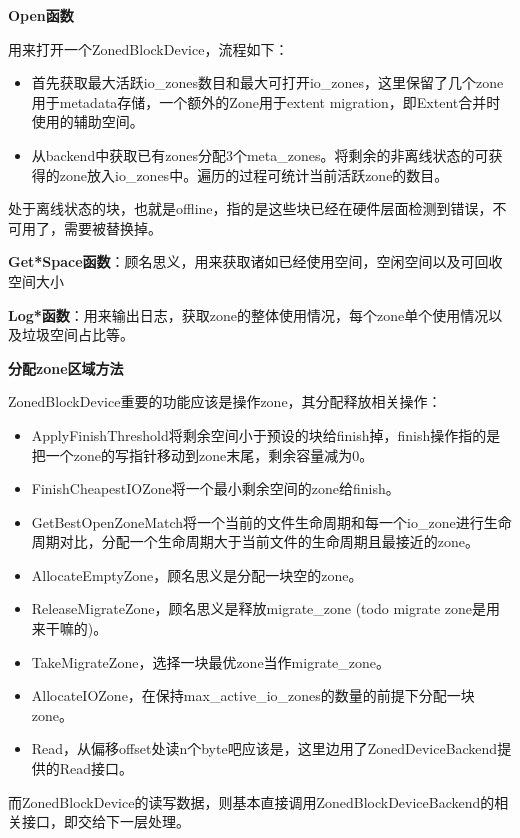 \textbf {Open函数}

用来打开一个ZonedBlockDevice，流程如下：

\begin{itemize}
  \item 首先获取最大活跃io\_zones数目和最大可打开io\_zones，这里保留了几个zone用于metadata存储，一个额外的Zone用于extent migration，即Extent合并时使用的辅助空间。
  \item 从backend中获取已有zones分配3个meta\_zones。将剩余的非离线状态的可获得的zone放入io\_zones中。遍历的过程可统计当前活跃zone的数目。
\end{itemize}

处于离线状态的块，也就是offline，指的是这些块已经在硬件层面检测到错误，不可用了，需要被替换掉。

\textbf {Get*Space函数}：顾名思义，用来获取诸如已经使用空间，空闲空间以及可回收空间大小

\textbf {Log*函数}：用来输出日志，获取zone的整体使用情况，每个zone单个使用情况以及垃圾空间占比等。

\textbf {分配zone区域方法}

ZonedBlockDevice重要的功能应该是操作zone，其分配释放相关操作：

\begin{itemize}
\item ApplyFinishThreshold将剩余空间小于预设的块给finish掉，finish操作指的是把一个zone的写指针移动到zone末尾，剩余容量减为0。
\item FinishCheapestIOZone将一个最小剩余空间的zone给finish。
\item GetBestOpenZoneMatch将一个当前的文件生命周期和每一个io\_zone进行生命周期对比，分配一个生命周期大于当前文件的生命周期且最接近的zone。
\item AllocateEmptyZone，顾名思义是分配一块空的zone。
\item ReleaseMigrateZone，顾名思义是释放migrate\_zone (todo migrate zone是用来干嘛的)。
\item TakeMigrateZone，选择一块最优zone当作migrate\_zone。
\item AllocateIOZone，在保持max\_active\_io\_zones的数量的前提下分配一块zone。
\item Read，从偏移offset处读n个byte吧应该是，这里边用了ZonedDeviceBackend提供的Read接口。
\end{itemize}

而ZonedBlockDevice的读写数据，则基本直接调用ZonedBlockDeviceBackend的相关接口，即交给下一层处理。


